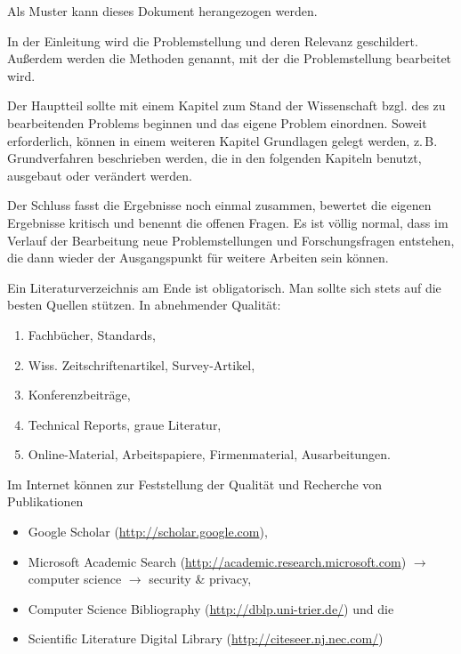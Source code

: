 \documentclass[
    fontsize=12pt,
    headings=small,
    parskip=half,           %
    bibliography=totoc,
    numbers=noenddot,       %
    open=any,               %
    ]{scrreprt}
\begin{document}
Als Muster kann dieses Dokument herangezogen werden.

In der Einleitung wird die Problemstellung und deren Relevanz geschildert. Außerdem werden die Methoden genannt, mit der die Problemstellung bearbeitet wird.

Der Hauptteil sollte mit einem Kapitel zum Stand der Wissenschaft bzgl. des zu bearbeitenden Problems beginnen und das eigene Problem einordnen. Soweit erforderlich, können in einem weiteren Kapitel Grundlagen gelegt werden, z.\,B. Grundverfahren beschrieben werden, die in den folgenden Kapiteln benutzt, ausgebaut oder verändert werden.

Der Schluss fasst die Ergebnisse noch einmal zusammen, bewertet die eigenen Ergebnisse kritisch und benennt die offenen Fragen. Es ist völlig normal, dass im Verlauf der Bearbeitung neue Problemstellungen und Forschungsfragen entstehen, die dann wieder der Ausgangspunkt für weitere Arbeiten sein können.

Ein Literaturverzeichnis am Ende ist obligatorisch. Man sollte sich stets auf die besten Quellen stützen. In abnehmender Qualität:

\begin{enumerate}
	\item Fachbücher, Standards,
	\item Wiss. Zeitschriftenartikel, Survey-Artikel,
	\item Konferenzbeiträge,
	\item Technical Reports, graue Literatur,
	\item Online-Material, Arbeitspapiere, Firmenmaterial, Ausarbeitungen.
\end{enumerate}

Im Internet können zur Feststellung der Qualität und Recherche von Publikationen

\begin{itemize}
	\item Google Scholar (\url{http://scholar.google.com}),
	\item Microsoft Academic Search (\href{http://academic.research.microsoft.com/?SearchDomain=2&SubDomain=2&entitytype=2}{http://academic.research.microsoft.com}) $\to$ computer science $\to$ security \& privacy,
	\item Computer Science Bibliography (\url{http://dblp.uni-trier.de/}) und die
	\item Scientific Literature Digital Library (\url{http://citeseer.nj.nec.com/})
\end{itemize}
\end{document}
